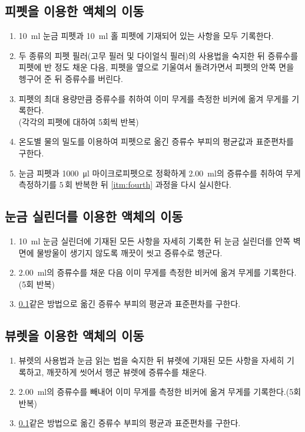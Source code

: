 \documentclass{GSHS-chemexp}
\begin{document}
	\subsection{피펫을 이용한 액체의 이동} \label{subsec:second}
	\begin{enumerate}
		\item \SI{10}{\milli\litre} 눈금 피펫과 \SI{10}{\milli\litre} 홀 피펫에
		기재되어 있는 사항을 모두 기록한다.
		\item 두 종류의 피펫 필러(고무 필러 및 다이얼식 필러)의 사용법을
		숙지한 뒤 증류수를 피펫에 반 정도 채운 다음,
		피펫을 옆으로 기울여서 돌려가면서 피펫의 안쪽 면을 헹구어 준 뒤
		증류수를 버린다.
		\item 피펫의 최대 용량만큼 증류수를 취하여
		이미 무게를 측정한 비커에 옮겨 무게를 기록한다.\\
		(각각의 피펫에 대하여 5회씩 반복)
		\item 온도별 물의 밀도를 이용하여
		피펫으로 옮긴 증류수 부피의 평균값과 표준편차를 구한다.
		\label{itm:fourth}
		\item 눈금 피펫과 \SI{1000}{\micro\litre} 마이크로피펫으로
		정확하게 \SI{2.00}{\milli\litre}의 증류수를 취하여
		무게 측정하기를 $5\,\mbox{회}$ 반복한 뒤
		\ref{itm:fourth} 과정을 다시 실시한다.
	\end{enumerate}
	
	\subsection{눈금 실린더를 이용한 액체의 이동}
	\begin{enumerate}
		\item \SI{10}{\milli\litre} 눈금 실린더에 기재된 모든 사항을
		자세히 기록한 뒤 눈금 실린더를 안쪽 벽면에 물방울이 생기지 않도록
		깨끗이 씻고 증류수로 헹군다.
		\item \SI{2.00}{\milli\litre}의 증류수를 채운 다음
		이미 무게를 측정한 비커에 옮겨 무게를 기록한다.(5회 반복)
		\item \ref{subsec:second}\과 같은 방법으로 옮긴 증류수 부피의 평균과 표준편차를 구한다.
	\end{enumerate}
	
	\subsection{뷰렛을 이용한 액체의 이동}
	\begin{enumerate}
		\item 뷰렛의 사용법과 눈금 읽는 법을 숙지한 뒤
		뷰렛에 기재된 모든 사항을 자세히 기록하고,
		깨끗하게 씻어서 헹군 뷰렛에 증류수를 채운다.
		\item \SI{2.00}{\milli\litre}의 증류수를 빼내어
		이미 무게를 측정한 비커에 옮겨 무게를 기록한다.(5회 반복)
		\item \ref{subsec:second}\과 같은 방법으로 옮긴 증류수 부피의 평균과 표준편차를 구한다.
	\end{enumerate}
	
\end{document}
